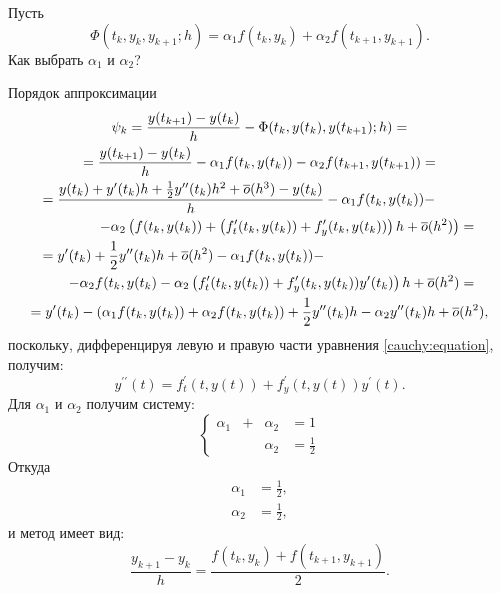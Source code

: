 \documentclass[a4paper,12pt]{article}
\begin{document}
Пусть
\[
    \Phi(t_k, y_k, y_{k+1}; h) = \alpha_1 f(t_k,y_k) + \alpha_2 f(t_{k+1}, y_{k+1}).
\]
Как выбрать $\alpha_1$ и $\alpha_2$?

Порядок аппроксимации
\begin{multline*}
    \psi_k = \frac{y(t_{k+1}) - y(t_k)}{h} - \Phi(t_k, y(t_k), y(t_{k+1}); h) = \\
    = \frac{y(t_{k+1}) - y(t_k)}{h} - \alpha_1 f(t_k,y(t_k)) - \alpha_2 f(t_{k+1}, y(t_{k+1})) = \\
    \shoveleft{
        = \frac{y(t_k) + y^\prime(t_k) h + \frac{1}{2} y^{\prime\prime}(t_k) h^2 + \overline{o}(h^3) - y(t_k)}{h}
        - \alpha_1 f(t_k,y(t_k)) - } \\
    \shoveright{
        - \alpha_2 \left( f(t_k, y(t_k)) + \left ( f_t^\prime(t_k, y(t_k)) + f_y^\prime(t_k, y(t_k)) \right) h + \overline{o}(h^2) \right ) =} \\
    \shoveleft{
        = y^\prime(t_k) + \frac{1}{2} y^{\prime\prime}(t_k) h + \overline{o}(h^2)
        - \alpha_1 f(t_k,y(t_k)) - } \\
    \shoveright{
        - \alpha_2 f(t_k, y(t_k) - \alpha_2 \left ( f_t^\prime(t_k, y(t_k)) + f_y^\prime(t_k, y(t_k))  y^\prime(t_k) \right) h + \overline{o}(h^2) =} \\
    = y^\prime(t_k) - \left ( \alpha_1 f(t_k,y(t_k)) + \alpha_2 f(t_k, y(t_k) \right )
    + \frac{1}{2} y^{\prime\prime}(t_k) h - \alpha_2 y^{\prime\prime}(t_k) h + \overline{o}(h^2) ,
\end{multline*}
поскольку, дифференцируя левую и правую части уравнения \eqref{cauchy:equation}, получим:
\[
    y^{\prime\prime}(t) = f_t^\prime(t, y(t)) + f_y^\prime(t, y(t))  y^\prime(t) .
\]
Для $\alpha_1$ и $\alpha_2$ получим систему:
\[
    \left \{
    \begin{array}{lcll}
        \alpha_1 & + & \alpha_2 & = 1           \\
                 &   & \alpha_2 & = \frac{1}{2}
    \end{array}
    \right .
\]
Откуда
\begin{align*}
    \alpha_1 & = \frac{1}{2} , \\
    \alpha_2 & = \frac{1}{2} ,
\end{align*}
и метод имеет вид:
\[
    \frac{y_{k+1} - y_k}{h} = \frac{f(t_k,y_k) + f(t_{k+1}, y_{k+1})}{2}.
\]
\end{document}
